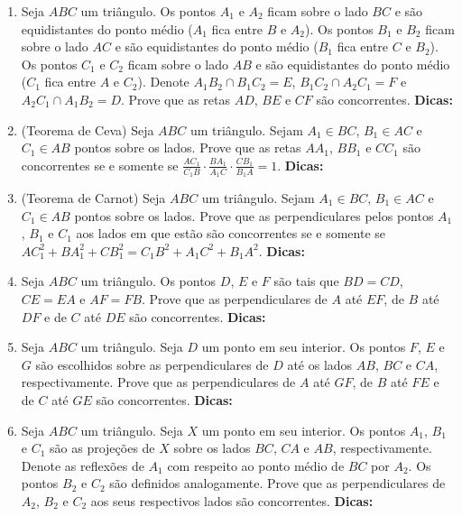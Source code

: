 \documentclass{article}
\newcommand{\dica}{\textbf{Dicas:}}
\newcommand{\iniTri}{Seja $ABC$ um triângulo}
\begin{document}
\begin{multicols}{2}
\begin{enumerate}
    \item \iniTri. Os pontos $A_1$ e $A_2$ ficam sobre o lado $BC$ e são equidistantes do ponto médio ($A_1$ fica entre $B$ e $A_2$). Os pontos $B_1$ e $B_2$ ficam sobre o lado $AC$ e são equidistantes do ponto médio ($B_1$ fica entre $C$ e $B_2$). Os pontos $C_1$ e $C_2$ ficam sobre o lado $AB$ e são equidistantes do ponto médio ($C_1$ fica entre $A$ e $C_2$). Denote $A_1B_2\cap B_1C_2=E$, $B_1C_2\cap A_2C_1=F$ e $A_2C_1\cap A_1B_2=D$. Prove que as retas $AD$, $BE$ e $CF$ são concorrentes. \dica %
    
    \item (Teorema de Ceva) \iniTri. Sejam $A_1\in BC$, $B_1\in AC$ e $C_1\in AB$ pontos sobre os lados. Prove que as retas $AA_1$, $BB_1$ e $CC_1$ são concorrentes se e somente se $\frac{AC_1}{C_1B}\cdot\frac{BA_1}{A_1C}\cdot\frac{CB_1}{B_1A}=1$. \dica %
    
    \item (Teorema de Carnot) \iniTri. Sejam $A_1\in BC$, $B_1\in AC$ e $C_1\in AB$ pontos sobre os lados. Prove que as perpendiculares pelos pontos $A_1$, $B_1$ e $C_1$ aos lados em que estão são concorrentes se e somente se $AC_1^2+BA_1^2+CB_1^2=C_1B^2+A_1C^2+B_1A^2$. \dica %
    
    \item \iniTri. Os pontos $D$, $E$ e $F$ são tais que $BD=CD$, $CE=EA$ e $AF=FB$. Prove que as perpendiculares de $A$ até $EF$, de $B$ até $DF$ e de $C$ até $DE$ são concorrentes. \dica %
    
    \item \iniTri. Seja $D$ um ponto em seu interior. Os pontos $F$, $E$ e $G$ são escolhidos sobre as perpendiculares de $D$ até os lados $AB$, $BC$ e $CA$, respectivamente. Prove que as perpendiculares de $A$ até $GF$, de $B$ até $FE$ e de $C$ até $GE$ são concorrentes. \dica %
    
    \item \iniTri. Seja $X$ um ponto em seu interior. Os pontos $A_1$, $B_1$ e $C_1$ são as projeções de $X$ sobre os lados $BC$, $CA$ e $AB$, respectivamente. Denote as reflexões de $A_1$ com respeito ao ponto médio de $BC$ por $A_2$. Os pontos $B_2$ e $C_2$ são definidos analogamente. Prove que as perpendiculares de $A_2$, $B_2$ e $C_2$ aos seus respectivos lados são concorrentes. \dica %
    

\end{enumerate}
\end{multicols}
\end{document}
